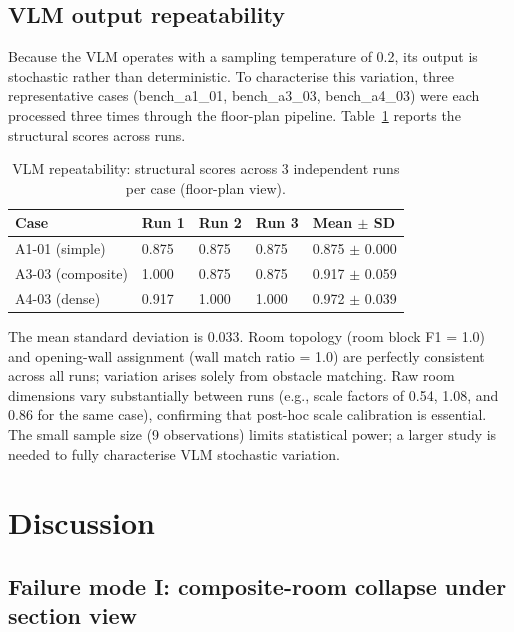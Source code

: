 \documentclass[preprint,12pt,number]{elsarticle}
\begin{document}
\subsection{VLM output repeatability}
\label{sec:vlm-output-repeatability}


Because the VLM operates with a sampling temperature of 0.2, its output is stochastic rather than deterministic. To characterise this variation, three representative cases (bench\_a1\_01, bench\_a3\_03, bench\_a4\_03) were each processed three times through the floor-plan pipeline. Table~\ref{tab:result-vlm-repeatability} reports the structural scores across runs.

\begin{table}[htbp]
\centering
\caption{VLM repeatability: structural scores across 3 independent runs per case (floor-plan view).}
\label{tab:result-vlm-repeatability}
\begin{tabular}{lllll}
\toprule
Case & Run 1 & Run 2 & Run 3 & Mean $\pm$ SD \\
\midrule
A1-01 (simple) & 0.875 & 0.875 & 0.875 & 0.875 $\pm$ 0.000 \\
A3-03 (composite) & 1.000 & 0.875 & 0.875 & 0.917 $\pm$ 0.059 \\
A4-03 (dense) & 0.917 & 1.000 & 1.000 & 0.972 $\pm$ 0.039 \\
\bottomrule
\end{tabular}
\end{table}


The mean standard deviation is 0.033. Room topology (room block F1 = 1.0) and opening-wall assignment (wall match ratio = 1.0) are perfectly consistent across all runs; variation arises solely from obstacle matching. Raw room dimensions vary substantially between runs (e.g., scale factors of 0.54, 1.08, and 0.86 for the same case), confirming that post-hoc scale calibration is essential. The small sample size (9 observations) limits statistical power; a larger study is needed to fully characterise VLM stochastic variation.


\section{Discussion}
\label{sec:discussion}


\subsection{Failure mode I: composite-room collapse under section view}
\label{sec:failure-mode-i-composite-room-collapse-under-section-view}
\end{document}
